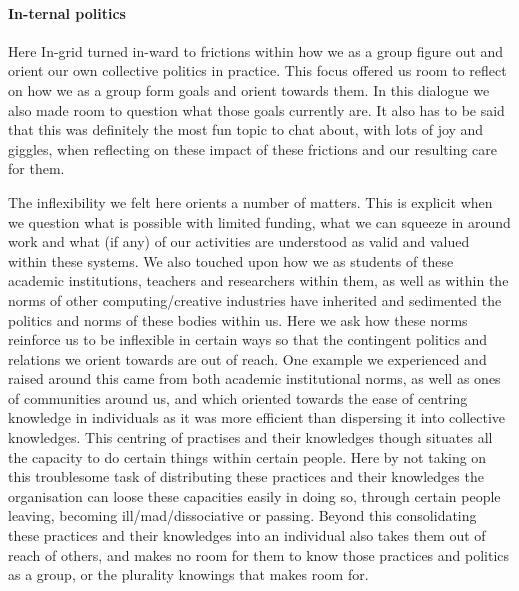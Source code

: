 \hypertarget{in-ternal-politics}{%
\paragraph[In-ternal
politics]{\texorpdfstring{\protect\hypertarget{anchor}{}{}In-ternal
politics}{In-ternal politics}}\label{in-ternal-politics}}

Here In-grid turned in-ward to frictions within how we as a group figure
out and orient our own collective politics in practice. This focus
offered us room to reflect on how we as a group form goals and orient
towards them. In this dialogue we also made room to question what those
goals currently are. It also has to be said that this was definitely the
most fun topic to chat about, with lots of joy and giggles, when
reflecting on these impact of these frictions and our resulting care for
them.

The inflexibility we felt here orients a number of matters. This is
explicit when we question what is possible with limited funding, what we
can squeeze in around work and what (if any) of our activities are
understood as valid and valued within these systems. We also touched
upon how we as students of these academic institutions, teachers and
researchers within them, as well as within the norms of other
computing/creative industries have inherited and sedimented the politics
and norms of these bodies within us. Here we ask how these norms
reinforce us to be inflexible in certain ways so that the contingent
politics and relations we orient towards are out of reach. One example
we experienced and raised around this came from both academic
institutional norms, as well as ones of communities around us, and which
oriented towards the ease of centring knowledge in individuals as it was
more efficient than dispersing it into collective knowledges. This
centring of practises and their knowledges though situates all the
capacity to do certain things within certain people. Here by not taking
on this troublesome task of distributing these practices and their
knowledges the organisation can loose these capacities easily in doing
so, through certain people leaving, becoming ill/mad/dissociative or
passing. Beyond this consolidating these practices and their knowledges
into an individual also takes them out of reach of others, and makes no
room for them to know those practices and politics as a group, or the
plurality knowings that makes room for.

